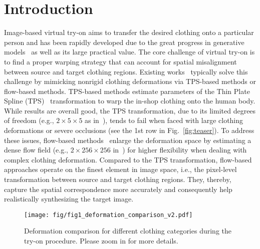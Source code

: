 \documentclass[sigconf]{acmart}
\begin{document}
\section{Introduction}
Image-based virtual try-on aims to transfer the desired clothing onto a particular person and has been rapidly developed due to the great progress in generative models~\cite{goodfellow2014gan,Mirza2014ConditionalGA,pix2pix2017,wang2018pix2pixHD} as well as its large practical value.
The core challenge of virtual try-on is to find a proper warping strategy that can account for spatial misalignment between source and target clothing regions.
Existing works~\cite{xintong2018viton,bochao2018cpvton,yun2019vtnfp,xintong2019clothflow,Matiur2020cpvton+,han2020acgpn,thibaut2020swuton} typically solve this challenge by mimicking nonrigid clothing deformations via TPS-based methods or flow-based methods.
TPS-based methods estimate parameters of the Thin Plate Spline (TPS)~\cite{bookstein1989TPS} transformation to warp the in-shop clothing onto the human body. While results are overall good, the TPS transformation, due to its limited degrees of freedom (e.g., $2\times5\times5$ as in~\cite{xintong2018viton,bochao2018cpvton}), tends to fail when faced with large clothing deformations or severe occlusions (see the 1st row in Fig.~\ref{fig:teaser}).  To address these issues, flow-based methods~\cite{xintong2019clothflow} enlarge the deformation space by estimating a dense flow field (e.g., $2\times256\times256$ in~\cite{xintong2019clothflow}) for higher flexibility when dealing with complex clothing deformation. 
Compared to the TPS transformation, 
flow-based approaches operate on the finest element in image space, i.e., the pixel-level transformation between source and target clothing regions. They, thereby, capture the spatial correspondence more accurately and consequently help realistically synthesizing the target image. 

\begin{figure}[t]
  \centering
  \texttt{[image: fig/fig1\_deformation\_comparison\_v2.pdf]}
  \vspace{-4mm}
  \caption{Deformation comparison for different clothing categories during the try-on procedure. Please zoom in for more details.}
  \vspace{-7mm}
  \label{fig:defomation_comparison}
\end{figure}
\end{document}
